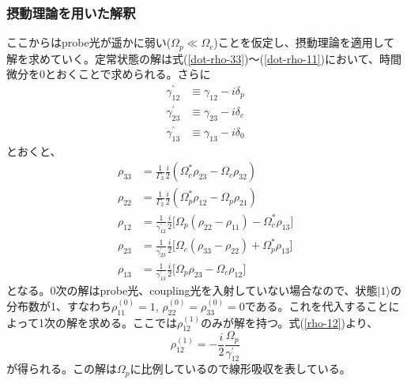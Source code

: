 \documentclass[dvipdfmx]{jsarticle}
\begin{document}
\subsubsection{摂動理論を用いた解釈}
ここからはprobe光が遥かに弱い($\Omega_p \ll \Omega_c$)ことを仮定し、摂動理論を適用して解を求めていく。定常状態の解は式(\ref{dot-rho-33})〜(\ref{dot-rho-11})において、時間微分を0とおくことで求められる。さらに
\begin{equation}
\begin{split}
    {\gamma_{12}^{'}} &\equiv \gamma_{12} - i\delta_p \\
    {\gamma_{23}^{'}} &\equiv \gamma_{23} - i\delta_c \\
    {\gamma_{13}^{'}} &\equiv \gamma_{13} - i\delta_0
\end{split}
\end{equation}
とおくと、
\begin{align}
\rho_{33} &= \frac{1}{\Gamma_3} \frac{i}{2} \left( \Omega_c^* {\rho_{23}} - \Omega_c{\rho_{32}} \right) \\
\label{rho-22}
\rho_{22} &= \frac{1}{\Gamma_2} \frac{i}{2} \left( \Omega_p^* {\rho_{12}} - \Omega_p{\rho_{21}} \right) \\
\label{rho-12}
\rho_{12} &= \frac{1}{\gamma_{12}^{'}} \frac{i}{2} \lbrack \Omega_p (\rho_{22} - \rho_{11}) - \Omega_c^* \rho_{13} \rbrack \\
\label{rho-23}
\rho_{23} &= \frac{1}{\gamma_{23}^{'}} \frac{i}{2} \lbrack \Omega_c (\rho_{33} - \rho_{22}) + \Omega_p^* \rho_{13} \rbrack \\
\rho_{13} &= \frac{1}{\gamma_{13}^{'}} \frac{i}{2} \lbrack \Omega_p \rho_{23} - \Omega_c \rho_{12} \rbrack
\end{align}
となる。0次の解はprobe光、coupling光を入射していない場合なので、状態$| 1 \rangle$の分布数が1、すなわち$\rho_{11}^{(0)} = 1$, $\rho_{22}^{(0)} = \rho_{33}^{(0)} = 0$である。これを代入することによって1次の解を求める。ここでは$\rho_{12}^{(1)}$のみが解を持つ。式(\ref{rho-12})より、
\begin{equation}
\label{rho-12-1}
    \rho_{12}^{(1)} = - \frac{i}{2} \frac{\Omega_p}{\gamma_{12}^{'}}
\end{equation}
が得られる。この解は$\Omega_p$に比例しているので線形吸収を表している。
\end{document}
